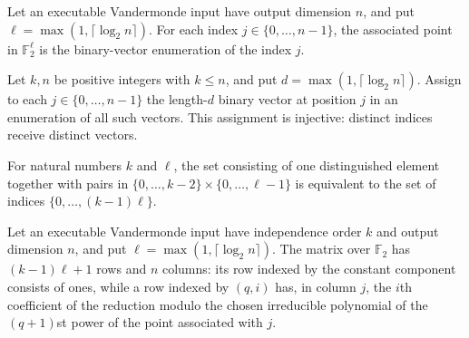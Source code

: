 \begin{definition}
\label{FABL.executableVandermondePoint}
\leanok
{}
Let an executable Vandermonde input have output dimension $n$, and put
$\ell=\max(1,\lceil\log_2 n\rceil)$. For each index $j\in\{0,\ldots,n-1\}$, the
associated point in $\mathbb{F}_2^\ell$ is the binary-vector enumeration of the index
$j$.
\end{definition}

\begin{theorem}
\label{FABL.executableVandermondePoint_injective}
\leanok
{}
Let $k,n$ be positive integers with $k\le n$, and put $d=\max(1,\lceil\log_2 n\rceil)$.
Assign to each $j\in\{0,\ldots,n-1\}$ the length-$d$ binary vector at position $j$ in an
enumeration of all such vectors. This assignment is injective: distinct indices receive
distinct vectors.
\end{theorem}

\begin{definition}
\label{FABL.executableVandermondeRowEquiv}
\leanok
{}
For natural numbers $k$ and $\ell$, the set consisting of one distinguished element
together with pairs in $\{0,\ldots,k-2\}\times\{0,\ldots,\ell-1\}$ is equivalent to the
set of indices $\{0,\ldots,(k-1)\ell\}$.
\end{definition}

\begin{definition}
\label{FABL.executableVandermondeMatrix}
\leanok
{}
Let an executable Vandermonde input have independence order $k$ and output dimension
$n$, and put $\ell=\max(1,\lceil\log_2 n\rceil)$. The matrix over $\mathbb{F}_2$ has
$(k-1)\ell+1$ rows and $n$ columns: its row indexed by the constant component consists
of ones, while a row indexed by $(q,i)$ has, in column $j$, the $i$th coefficient of the
reduction modulo the chosen irreducible polynomial of the $(q+1)$st power of the point
associated with $j$.
\end{definition}

